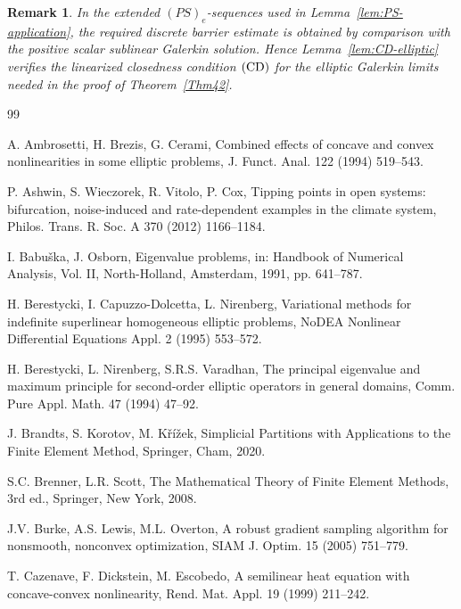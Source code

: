\documentclass[preprint,10pt]{elsarticle}
\numberwithin{equation}{section}
\newtheorem{rem}[thm]{Remark}
\begin{document}
\begin{rem}
	In the extended \((PS)_e\)-sequences used in
	Lemma~\ref{lem:PS-application}, the required discrete barrier estimate is
	obtained by comparison with the positive scalar sublinear Galerkin
	solution. Hence Lemma~\ref{lem:CD-elliptic} verifies the linearized
	closedness condition \({\rm (CD)}\) for the elliptic Galerkin limits needed
	in the proof of Theorem~\ref{Thm42}.
\end{rem}
\begin{thebibliography}{99}
	
	A. Ambrosetti, H. Brezis, G. Cerami, Combined effects of concave and convex
	nonlinearities in some elliptic problems, J. Funct. Anal. 122 (1994) 519--543.
	
	P. Ashwin, S. Wieczorek, R. Vitolo, P. Cox, Tipping points in open systems:
	bifurcation, noise-induced and rate-dependent examples in the climate system,
	Philos. Trans. R. Soc. A 370 (2012) 1166--1184.
	
	
	I. Babu\v{s}ka, J. Osborn, Eigenvalue problems, in: Handbook of Numerical
	Analysis, Vol. II, North-Holland, Amsterdam, 1991, pp. 641--787.
	

	
	H. Berestycki, I. Capuzzo-Dolcetta, L. Nirenberg, Variational methods for
	indefinite superlinear homogeneous elliptic problems, NoDEA Nonlinear
	Differential Equations Appl. 2 (1995) 553--572.
	
	H. Berestycki, L. Nirenberg, S.R.S. Varadhan, The principal eigenvalue and
	maximum principle for second-order elliptic operators in general domains,
	Comm. Pure Appl. Math. 47 (1994) 47--92.
	
	J. Brandts, S. Korotov, M. K\v{r}\'i\v{z}ek, Simplicial Partitions with
	Applications to the Finite Element Method, Springer, Cham, 2020.
	
	S.C. Brenner, L.R. Scott, The Mathematical Theory of Finite Element Methods,
	3rd ed., Springer, New York, 2008.
	
	J.V. Burke, A.S. Lewis, M.L. Overton, A robust gradient sampling algorithm for
	nonsmooth, nonconvex optimization, SIAM J. Optim. 15 (2005) 751--779.
	
	T. Cazenave, F. Dickstein, M. Escobedo, A semilinear heat equation with
	concave-convex nonlinearity, Rend. Mat. Appl. 19 (1999) 211--242.
	

\end{thebibliography}
\end{document}
